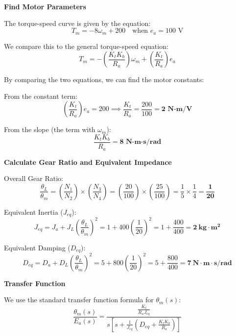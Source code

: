 \documentclass[11pt]{article}
\begin{document}
\vspace{5pt}



\noindent\textbf{Find Motor Parameters}

The torque-speed curve is given by the equation:
\[
T_m = -8\omega_m + 200 \quad \text{when } e_a = 100 \text{ V}
\]

We compare this to the general torque-speed equation:
\[
T_m = -\left(\frac{K_t K_b}{R_a}\right)\omega_m + \left(\frac{K_t}{R_a}\right)e_a
\]

By comparing the two equations, we can find the motor constants:

\vspace{5pt}
{From the constant term:}
\[
\left(\frac{K_t}{R_a}\right)e_a = 200 \implies \frac{K_t}{R_a} = \frac{200}{100} = \mathbf{2 \text{ N-m/V}}
\]

\vspace{5pt}
{From the slope (the term with $\omega_m$):}
\[
\frac{K_t K_b}{R_a} = \mathbf{8 \text{ N-m-s/rad}}
\]

\vspace{5pt}
\noindent\textbf{Calculate Gear Ratio and Equivalent Impedance}



\vspace{5pt}
{Overall Gear Ratio:}
\[
\frac{\theta_L}{\theta_m} = \left(\frac{N_1}{N_2}\right) \times \left(\frac{N_3}{N_4}\right)
= \left(\frac{20}{100}\right) \times \left(\frac{25}{100}\right)
= \frac{1}{5} \times \frac{1}{4} = \mathbf{\frac{1}{20}}
\]

\vspace{5pt}
{Equivalent Inertia ($J_{eq}$):}
\[
J_{eq} = J_a + J_L\left(\frac{\theta_L}{\theta_m}\right)^2
= 1 + 400\left(\frac{1}{20}\right)^2 = 1 + \frac{400}{400}
= \mathbf{2\ \text{kg}\cdot\text{m}^2}
\]

\vspace{5pt}
{Equivalent Damping ($D_{eq}$):}
\[
D_{eq} = D_a + D_L\left(\frac{\theta_L}{\theta_m}\right)^2
= 5 + 800\left(\frac{1}{20}\right)^2 = 5 + \frac{800}{400}
= \mathbf{7\ \text{N}\cdot\text{m}\cdot\text{s/rad}}
\]

\vspace{5pt}
\noindent\textbf{Transfer Function}

\vspace{5pt}
We use the standard transfer function formula for $\theta_m(s)$:
\[
\frac{\theta_m(s)}{E_a(s)} = \frac{\frac{K_t}{R_a J_{eq}}}
{s\left[s + \frac{1}{J_{eq}}\left(D_{eq} + \frac{K_t K_b}{R_a}\right)\right]}
\]
\end{document}
